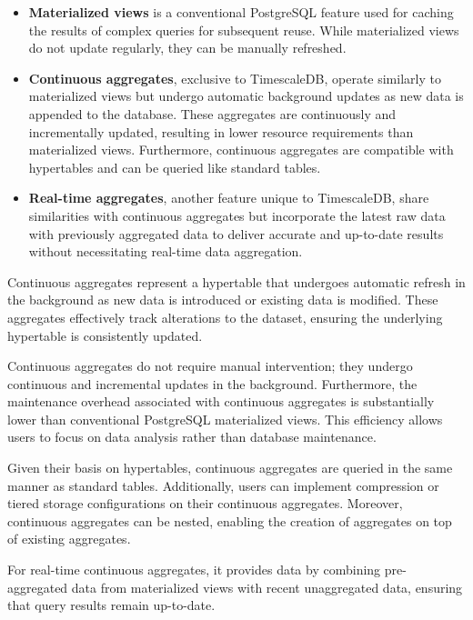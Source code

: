 \begin{itemize}
    \item \textbf{Materialized views} is a conventional PostgreSQL feature used for caching the results of complex queries for subsequent reuse. While materialized views do not update regularly, they can be manually refreshed.

    \item \textbf{Continuous aggregates}, exclusive to TimescaleDB, operate similarly to materialized views but undergo automatic background updates as new data is appended to the database. These aggregates are continuously and incrementally updated, resulting in lower resource requirements than materialized views. Furthermore, continuous aggregates are compatible with hypertables and can be queried like standard tables.

    \item \textbf{Real-time aggregates}, another feature unique to TimescaleDB, share similarities with continuous aggregates but incorporate the latest raw data with previously aggregated data to deliver accurate and up-to-date results without necessitating real-time data aggregation.
\end{itemize}

Continuous aggregates represent a hypertable that undergoes automatic refresh in the background as new data is introduced or existing data is modified. These aggregates effectively track alterations to the dataset, ensuring the underlying hypertable is consistently updated.

Continuous aggregates do not require manual intervention; they undergo continuous and incremental updates in the background. Furthermore, the maintenance overhead associated with continuous aggregates is substantially lower than conventional PostgreSQL materialized views. This efficiency allows users to focus on data analysis rather than database maintenance.

Given their basis on hypertables, continuous aggregates are queried in the same manner as standard tables. Additionally, users can implement compression or tiered storage configurations on their continuous aggregates. Moreover, continuous aggregates can be nested, enabling the creation of aggregates on top of existing aggregates.

For real-time continuous aggregates, it provides data by combining pre-aggregated data from materialized views with recent unaggregated data, ensuring that query results remain up-to-date.

